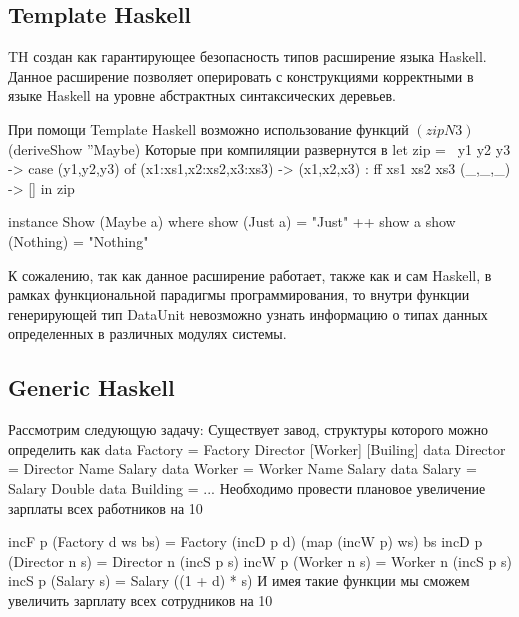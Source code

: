 \documentclass[a4paper,12pt]{article}
\newenvironment{code}{\footnotesize\verbatim}{\endverbatim\normalsize}
\begin{document}
\subsection{Template Haskell}

TH создан как гарантирующее безопасность типов расширение языка
Haskell. Данное расширение позволяет оперировать с конструкциями
корректными в языке Haskell на уровне абстрактных синтаксических
деревьев.

При помощи Template Haskell возможно использование функций
\begin{code}
$(zipN 3)
$(deriveShow ''Maybe)
\end{code}
Которые при компиляции развернутся в
\begin{code}
let zip = \ y1 y2 y3 ->
  case (y1,y2,y3) of
    (x1:xs1,x2:xs2,x3:xs3) -> (x1,x2,x3) : ff xs1 xs2 xs3
    (_,_,_) -> []
in zip

instance Show (Maybe a) where
  show (Just a) = "Just" ++ show a
  show (Nothing) = "Nothing"
\end{code}

К сожалению, так как данное расширение работает, также как и сам
Haskell, в рамках функциональной парадигмы программирования, то внутри
функции генерирующей тип DataUnit невозможно узнать информацию о типах
данных определенных в различных модулях системы.

\subsection{Generic Haskell}

Рассмотрим следующую задачу: Существует завод, структуры которого
можно определить как
\begin{code}
  data Factory  = Factory Director [Worker] [Builing]
  data Director = Director Name Salary
  data Worker   = Worker Name Salary
  data Salary   = Salary Double
  data Building = ...
\end{code}
Необходимо провести плановое увеличение зарплаты всех работников на
10%

\begin{code}
  incF p (Factory d ws bs) = Factory (incD p d) (map (incW p) ws) bs
  incD p (Director n s) = Director n (incS p s)
  incW p (Worker n s)   = Worker n (incS p s)
  incS p (Salary s)     = Salary ((1 + d) * s)
\end{code}
И имея такие функции мы сможем увеличить зарплату всех сотрудников на
10%
\end{document}

